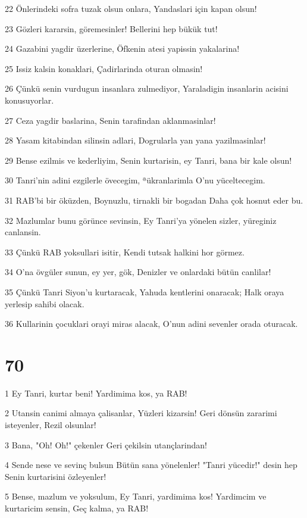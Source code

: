 \par 22 Önlerindeki sofra tuzak olsun onlara, Yandaslari için kapan olsun!
\par 23 Gözleri kararsin, göremesinler! Bellerini hep bükük tut!
\par 24 Gazabini yagdir üzerlerine, Öfkenin atesi yapissin yakalarina!
\par 25 Issiz kalsin konaklari, Çadirlarinda oturan olmasin!
\par 26 Çünkü senin vurdugun insanlara zulmediyor, Yaraladigin insanlarin acisini konusuyorlar.
\par 27 Ceza yagdir baslarina, Senin tarafindan aklanmasinlar!
\par 28 Yasam kitabindan silinsin adlari, Dogrularla yan yana yazilmasinlar!
\par 29 Bense ezilmis ve kederliyim, Senin kurtarisin, ey Tanri, bana bir kale olsun!
\par 30 Tanri'nin adini ezgilerle övecegim, ªükranlarimla O'nu yüceltecegim.
\par 31 RAB'bi bir öküzden, Boynuzlu, tirnakli bir bogadan Daha çok hosnut eder bu.
\par 32 Mazlumlar bunu görünce sevinsin, Ey Tanri'ya yönelen sizler, yüreginiz canlansin.
\par 33 Çünkü RAB yoksullari isitir, Kendi tutsak halkini hor görmez.
\par 34 O'na övgüler sunun, ey yer, gök, Denizler ve onlardaki bütün canlilar!
\par 35 Çünkü Tanri Siyon'u kurtaracak, Yahuda kentlerini onaracak; Halk oraya yerlesip sahibi olacak.
\par 36 Kullarinin çocuklari orayi miras alacak, O'nun adini sevenler orada oturacak.

\chapter{70}

\par 1 Ey Tanri, kurtar beni! Yardimima kos, ya RAB!
\par 2 Utansin canimi almaya çalisanlar, Yüzleri kizarsin! Geri dönsün zararimi isteyenler, Rezil olsunlar!
\par 3 Bana, "Oh! Oh!" çekenler Geri çekilsin utançlarindan!
\par 4 Sende nese ve sevinç bulsun Bütün sana yönelenler! "Tanri yücedir!" desin hep Senin kurtarisini özleyenler!
\par 5 Bense, mazlum ve yoksulum, Ey Tanri, yardimima kos! Yardimcim ve kurtaricim sensin, Geç kalma, ya RAB!

